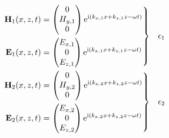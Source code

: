 \begin{align}
\left.\begin{aligned}
\mathbf{H}_1(x,z,t) &=
\begin{pmatrix}
0\\
H_{y,1}\\
0
\end{pmatrix} {\mathrm{e}}^{{\mathrm{i}}(k_{x,1}x+k_{z,1}z-\omega t)}\\
\mathbf{E}_1(x,z,t) &=
\begin{pmatrix}
E_{x,1}\\
0\\
E_{z,1}\\
\end{pmatrix} {\mathrm{e}}^{{\mathrm{i}}(k_{x,1}x+k_{z,1}z-\omega t)}
\end{aligned}
\right\}& \quad \epsilon_1\label{eqn:planewavedielectric}\\
\left.\begin{aligned}
\mathbf{H}_2(x,z,t) &=
\begin{pmatrix}
0\\
H_{y,2}\\
0
\end{pmatrix}
{\mathrm{e}}^{{\mathrm{i}}(k_{x,2}x+k_{z,2}z-\omega t)}\\
\mathbf{E}_2(x,z,t) &=
\begin{pmatrix}
E_{x,2}\\
0\\
E_{z,2}\\
\end{pmatrix}
{\mathrm{e}}^{{\mathrm{i}}(k_{x,2}x+k_{z,2}z-\omega t)}
\end{aligned} 
\right\}&\quad \epsilon_2
\label{eqn:planewavemetal}
\end{align}

